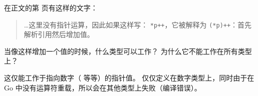 \begin{Exercise}[title={指针运算},difficulty=1]
\label{ex:pointer arithmetic}
\Question
在正文的第 \pageref{main:pointer arithmetic} 页有这样的文字：

\begin{quote}
\ldots 这里没有指针运算，因此如果这样写：
\lstinline{*p++}，它被解释为 \lstinline{(*p)++}：首先解析引用然后增加值。
\end{quote}

当像这样增加一个值的时候，什么类型可以工作？
\Question 为什么它不能工作在所有类型上？

\end{Exercise}

\begin{Answer}
\Question 这仅能工作于指向数字（ 等等）的指针值。 
\Question \func{++} 仅仅定义在数字类型上，同时由于在 Go 中没有运算符重载，所以会在其他类型上失败（编译错误）。
\end{Answer}

